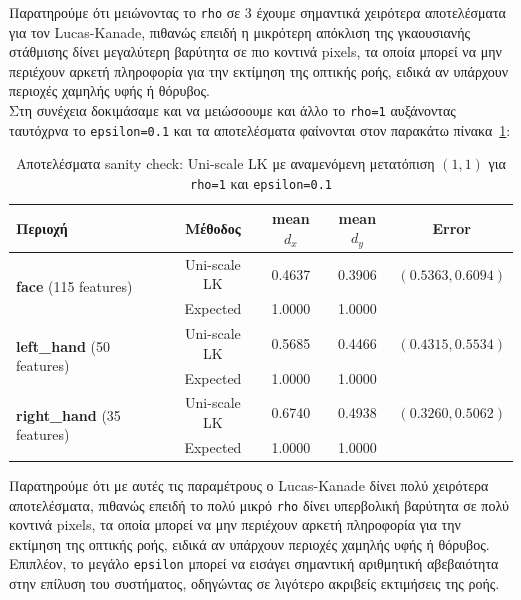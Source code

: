 \documentclass[12pt, a4paper]{article}
\begin{document}
Παρατηρούμε ότι μειώνοντας το \texttt{rho} σε 3 έχουμε σημαντικά χειρότερα αποτελέσματα για τον Lucas-Kanade, πιθανώς επειδή η μικρότερη απόκλιση της γκαουσιανής στάθμισης δίνει μεγαλύτερη βαρύτητα σε πιο κοντινά pixels, τα οποία μπορεί να μην περιέχουν αρκετή πληροφορία για την εκτίμηση της οπτικής ροής, ειδικά αν υπάρχουν περιοχές χαμηλής υφής ή θόρυβος.\\

Στη συνέχεια δοκιμάσαμε και να μειώσοουμε και άλλο το \texttt{rho=1} αυξάνοντας ταυτόχρνα  το \texttt{epsilon=0.1} και τα αποτελέσματα φαίνονται στον παρακάτω πίνακα~\ref{table:sanity_check_4}:

\begin{table}[H]
\centering
\setlength{\tabcolsep}{6pt}
\begin{tabular}{lcccc}
\toprule
\textbf{Περιοχή} & \textbf{Μέθοδος} & \textbf{mean $d_x$} & \textbf{mean $d_y$} & \textbf{Error} \\
\midrule
\multirow{2}{*}{\textbf{face} (115 features)} & Uni-scale LK & 0.4637 & 0.3906 & $(0.5363, 0.6094)$ \\
 & Expected & 1.0000 & 1.0000 & \\
\midrule
\multirow{2}{*}{\textbf{left\_hand} (50 features)} & Uni-scale LK & 0.5685 & 0.4466 & $(0.4315, 0.5534)$ \\
 & Expected & 1.0000 & 1.0000 & \\
\midrule
\multirow{2}{*}{\textbf{right\_hand} (35 features)} & Uni-scale LK & 0.6740 & 0.4938 & $(0.3260, 0.5062)$ \\
 & Expected & 1.0000 & 1.0000 & \\
\bottomrule
\end{tabular}
\caption{Αποτελέσματα sanity check: Uni-scale LK με αναμενόμενη μετατόπιση $(1, 1)$ για \texttt{rho=1} και \texttt{epsilon=0.1}}
\label{table:sanity_check_4}
\end{table}

Παρατηρούμε ότι με αυτές τις παραμέτρους ο Lucas-Kanade δίνει πολύ χειρότερα αποτελέσματα, πιθανώς επειδή το πολύ μικρό \texttt{rho} δίνει υπερβολική βαρύτητα σε πολύ κοντινά pixels, τα οποία μπορεί να μην περιέχουν αρκετή πληροφορία για την εκτίμηση της οπτικής ροής, ειδικά αν υπάρχουν περιοχές χαμηλής υφής ή θόρυβος. Επιπλέον, το μεγάλο \texttt{epsilon} μπορεί να εισάγει σημαντική αριθμητική αβεβαιότητα στην επίλυση του συστήματος, οδηγώντας σε λιγότερο ακριβείς εκτιμήσεις της ροής.\\
\end{document}
